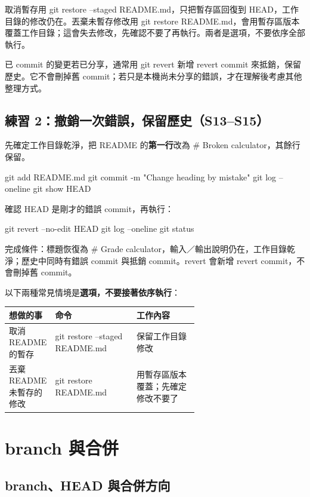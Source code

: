 \documentclass[11pt,a4paper]{article}
\DeclareRobustCommand{\code}[1]{{\small\ttfamily #1}}
\begin{document}
取消暫存用 \code{git restore --staged README.md}，只把暫存區回復到 \code{HEAD}，工作目錄的修改仍在。丟棄未暫存修改用 \code{git restore README.md}，會用暫存區版本覆蓋工作目錄；這會失去修改，先確認不要了再執行。兩者是選項，不要依序全部執行。

已 commit 的變更若已分享，通常用 \code{git revert} 新增 revert commit 來抵銷，保留歷史。它不會刪掉舊 commit；若只是本機尚未分享的錯誤，才在理解後考慮其他整理方式。

\subsection{練習 2：撤銷一次錯誤，保留歷史（S13–S15）}

先確定工作目錄乾淨，把 README 的\textbf{第一行}改為 \code{\# Broken calculator}，其餘行保留。

\begin{Code}
git add README.md
git commit -m "Change heading by mistake"
git log --oneline
git show HEAD
\end{Code}

確認 \code{HEAD} 是剛才的錯誤 commit，再執行：

\begin{Code}
git revert --no-edit HEAD
git log --oneline
git status
\end{Code}

完成條件：標題恢復為 \code{\# Grade calculator}，輸入／輸出說明仍在，工作目錄乾淨；歷史中同時有錯誤 commit 與抵銷 commit。\code{revert} 會新增 revert commit，不會刪掉舊 commit。

以下兩種常見情境是\textbf{選項，不要接著依序執行}：

\noindent\begin{tabularx}{\linewidth}{@{}p{0.2\linewidth}p{0.43\linewidth}X@{}}
\toprule
想做的事 & 命令 & 工作內容 \\
\midrule
取消 README 的暫存 & \code{git restore --staged README.md} & 保留工作目錄修改 \\
\addlinespace
丟棄 README 未暫存的修改 & \code{git restore README.md} & 用暫存區版本覆蓋；先確定修改不要了 \\
\bottomrule
\end{tabularx}

\section{branch 與合併}

\subsection{branch、HEAD 與合併方向}
\end{document}
